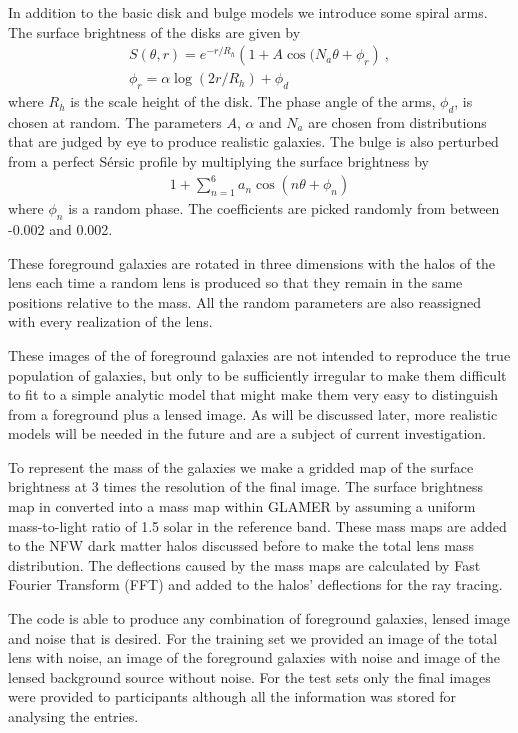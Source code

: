 \documentclass{aa}
\begin{document}
In addition to the basic disk and bulge models we introduce some spiral arms.  The surface brightness of 
the disks are given by
\begin{align}
S(\theta,r) = e^{-r/R_h} \left( 1 + A \cos(N_a\theta + \phi_r \right) ~, \\
\phi_r = \alpha\log(2 r/ R_h) + \phi_d \nonumber
\end{align}
where $R_h$ is the scale height of the disk.  The phase angle of the arms, $\phi_d$, is chosen at random.  The parameters $A$, $\alpha$ and $N_a$ are chosen from distributions that are judged by eye to produce realistic 
galaxies.
The bulge is also perturbed from a perfect S\'{e}rsic profile by multiplying the surface brightness by
\begin{align}
1+\sum_{n=1}^6 a_n \cos\left( n \theta  + \phi_n \right)
\end{align}
where $\phi_n$ is a random phase.  The coefficients are picked randomly from between -0.002 and 0.002. 

These foreground galaxies are rotated in three dimensions with the halos of the lens each time a random lens is produced so that they remain in the same positions relative to the mass.  All the random parameters are also reassigned with every realization of the lens.

These images of the of foreground galaxies are not intended to reproduce the true population of galaxies, but only to be sufficiently irregular to make them difficult to fit to a simple analytic model that might make them very easy to distinguish from a foreground plus a lensed image.   As will be discussed later, more realistic models will be needed in the future and are a subject of current investigation.

To represent the mass of the galaxies we make a gridded map of the surface brightness at 3 times the resolution of the final image.  The surface brightness map in converted into a mass map within GLAMER by assuming a uniform mass-to-light ratio of 1.5 solar in the reference band.  These mass maps are added to the NFW dark matter halos discussed before to make the total lens mass distribution.  The deflections caused by the mass maps are calculated by Fast Fourier Transform (FFT) and added to the halos'  deflections for the ray tracing. 

The code is able to produce any combination of foreground galaxies, lensed image and noise that is desired.  For the training set we provided an image of the total lens with noise, an image of the foreground galaxies with noise and image of the lensed background source without noise.
For the test sets only the final images were provided to participants although all the information was stored for analysing the entries.
\end{document}
